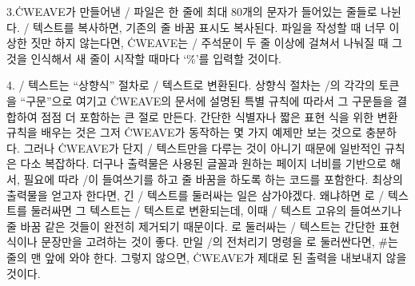 3.\.{CWEAVE}가 만들어낸 \TEX/ 파일은 한 줄에 최대 80개의 문자가 들어있는 줄들로 나뉜다.
\TEX/ 텍스트를 복사하면, 기존의 줄 바꿈 표시도 복사된다. 파일을 작성할 때 너무 이상한 짓만
하지 않는다면, \.{CWEAVE}는 \TEX/ 주석문이 두 줄 이상에 걸쳐서 나눠질 때 그것을
인식해서 새 줄이 시작할 때마다 `\.\%'를 입력할 것이다.

4. \CEE/ 텍스트는 ``상향식'' 절차로 \TEX/ 텍스트로 변환된다. 상향식 절차는
\CEE/의 각각의 토큰을 ``구문''으로 여기고 \.{CWEAVE}의 문서에 설명된
특별 규칙에 따라서 그 구문들을 결합하여 점점 더 포함하는 큰 절로 만든다. 간단한 식별자나 짧은
표현 식을 위한 변환 규칙을 배우는 것은 그저 \.{CWEAVE}가 동작하는 몇 가지 예제만 보는 것으로
충분하다. 그러나 \.{CWEAVE}가 단지 \CEE/ 텍스트만을 다루는 것이 아니기 때문에 일반적인
규칙은 다소 복잡하다. 더구나 출력물은 사용된 글꼴과 원하는 페이지 너비를 기반으로 해서, 필요에
따라 \TEX/이 들여쓰기를 하고 줄 바꿈을 하도록 하는 코드를 포함한다. 최상의 출력물을 얻고자
한다면, 긴 \CEE/ 텍스트를  둘러싸는 일은 삼가야겠다. 왜냐하면 \pb 로 \CEE/ 텍스트를
둘러싸면 그 텍스트는 \TEX/ 텍스트로 변환되는데, 이때 \CEE/ 텍스트 고유의 들여쓰기나 줄 바꿈
같은 것들이 완전히 제거되기 때문이다. \pb 로 둘러싸는 \CEE/ 텍스트는 간단한 표현 식이나
문장만을 고려하는 것이 좋다. 만일 \CEE/의 전처리기 명령을 \pb 로 둘러싼다면, \.\#는 줄의 맨
앞에 와야 한다. 그렇지 않으면, \.{CWEAVE}가 제대로 된 출력을 내보내지 않을 것이다.

